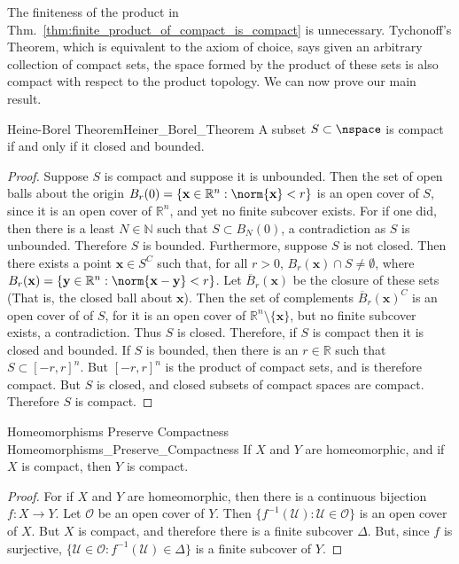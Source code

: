     The finiteness of the product in
    Thm.~\ref{thm:finite_product_of_compact_is_compact} is unnecessary.
    Tychonoff's Theorem, which is equivalent to the axiom of choice, says
    given an arbitrary collection of compact sets, the space formed by the
    product of these sets is also compact with respect to the product
    topology. We can now prove our main result.
    \begin{ftheorem}{Heine-Borel Theorem}{Heiner_Borel_Theorem}
        A subset $S\subset\nspace$ is compact if
        and only if it closed and bounded.
    \end{ftheorem}
    \begin{proof}
        Suppose $S$ is compact and suppose it is unbounded. Then the
        set of open balls about the origin
        $B_{r}(0)=\{\mathbf{x}\in\mathbb{R}^{n}:\norm{\mathbf{x}}<r\}$
        is an open cover of $S$, since it is an open cover of
        $\mathbb{R}^{n}$, and yet no finite subcover exists. For if
        one did, then there is a least $N\in\mathbb{N}$ such that
        $S\subset{B_{N}(0)}$, a contradiction as $S$ is unbounded.
        Therefore $S$ is bounded. Furthermore, suppose $S$ is
        not closed. Then there exists a point $\mathbf{x}\in{S^{C}}$
        such that, for all $r>0$,
        $B_{r}(\mathbf{x})\cap{S}\ne\emptyset$, where
        $B_{r}(\mathbf{x})=\{\mathbf{y}\in\mathbb{R}^{n}:%
         \norm{\mathbf{x}-\mathbf{y}}<r\}$.
        Let $\overline{B}_{r}(\mathbf{x})$ be the closure of these sets
        (That is, the closed ball about $\mathbf{x}$). Then the set of
        complements $\overline{B}_{r}(\mathbf{x})^{C}$ is an open cover
        of of $S$, for it is an open cover of
        $\mathbb{R}^{n}\setminus\{\mathbf{x}\}$, but no finite subcover
        exists, a contradiction. Thus $S$ is closed. Therefore, if $S$
        is compact then it is closed and bounded. If $S$ is bounded,
        then there is an $r\in\mathbb{R}$ such that
        $S\subset[-r,r]^{n}$. But $[-r,r]^{n}$ is the product of compact
        sets, and is therefore compact. But $S$ is closed, and closed
        subsets of compact spaces are compact. Therefore $S$ is compact.
    \end{proof}
    \begin{ltheorem}{Homeomorphisms Preserve Compactness}
                    {Homeomorphisms_Preserve_Compactness}
        If $X$ and $Y$ are homeomorphic, and if $X$ is compact,
        then $Y$ is compact.
    \end{ltheorem}
    \begin{proof}
        For if $X$ and $Y$ are homeomorphic, then there
        is a continuous bijection $f:X\rightarrow{Y}$.
        Let $\mathcal{O}$ be an open cover of $Y$.
        Then $\{f^{-1}(\mathcal{U}):\mathcal{U}\in\mathcal{O}\}$
        is an open cover of $X$. But $X$ is compact, and therefore
        there is a finite subcover $\Delta$. But, since $f$ is
        surjective,
        $\{\mathcal{U}\in\mathcal{O}:f^{-1}(\mathcal{U})\in\Delta\}$
        is a finite subcover of $Y$.
    \end{proof}
